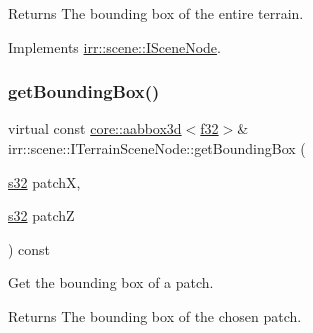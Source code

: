 \begin{DoxyReturn}{Returns}
The bounding box of the entire terrain. 
\end{DoxyReturn}


Implements \hyperlink{classirr_1_1scene_1_1ISceneNode_a223f718fc2f4944b5ad28c592f6cc8c6}{irr\+::scene\+::\+I\+Scene\+Node}.

\mbox{\label{classirr_1_1scene_1_1ITerrainSceneNode_a383501cc9c5cd30176f1f7ff6f8ab817}} 
\subsubsection{\texorpdfstring{get\+Bounding\+Box()}{getBoundingBox()}\hspace{0.1cm}{\footnotesize\ttfamily [3/4]}}
{\footnotesize\ttfamily virtual const \hyperlink{classirr_1_1core_1_1aabbox3d}{core\+::aabbox3d}$<$\hyperlink{namespaceirr_a0277be98d67dc26ff93b1a6a1d086b07}{f32}$>$\& irr\+::scene\+::\+I\+Terrain\+Scene\+Node\+::get\+Bounding\+Box (\begin{DoxyParamCaption}\item[{\hyperlink{namespaceirr_ac66849b7a6ed16e30ebede579f9b47c6}{s32}}]{patchX,  }\item[{\hyperlink{namespaceirr_ac66849b7a6ed16e30ebede579f9b47c6}{s32}}]{patchZ }\end{DoxyParamCaption}) const\hspace{0.3cm}{\ttfamily [pure virtual]}}



Get the bounding box of a patch. 

\begin{DoxyReturn}{Returns}
The bounding box of the chosen patch. 
\end{DoxyReturn}
\mbox{\label{classirr_1_1scene_1_1ITerrainSceneNode_a383501cc9c5cd30176f1f7ff6f8ab817}} 
